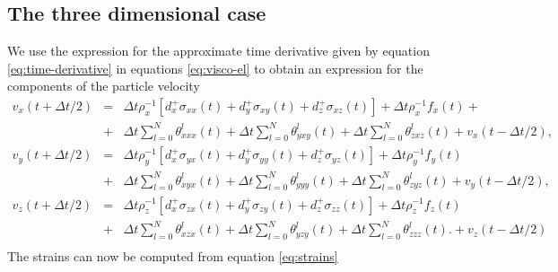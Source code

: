 \documentclass[11pt]{article}
\begin{document}
\subsection{The three dimensional case}

We use the expression for the approximate time derivative given by 
equation \eqref{eq:time-derivative}
in equations \eqref{eq:visco-el} to obtain an expression for the components of the particle velocity
\begin{eqnarray}
v_x(t+\Delta t/2) & = & \Delta t\rho_x^{-1}\left[d^+_x \sigma_{xx}(t) 
                         +d^+_y \sigma_{xy}(t) 
                         +d^+_z \sigma_{xz}(t)\right] 
                         + \Delta t \rho_x^{-1}f_x(t) +            \nonumber\\ 
                  & + & \Delta t \sum_{l=0}^N
                        \theta^l_{xxx}(t) +  
                        \Delta t \sum_{l=0}^N\theta^l_{yxy}(t) 
                     +  \Delta t \sum_{l=0}^N\theta^l_{zxz}(t)
                     +v_x(t-\Delta t/2),                           \nonumber\\
%
v_y(t+\Delta t/2) & = & \Delta t\rho_y^{-1}\left[d^+_x \sigma_{yx}(t) 
                        +d^+_y \sigma_{yy}(t) +d^+_z \sigma_{yz}(t)\right] 
                         + \Delta t \rho_y^{-1}f_y(t)              \nonumber\\
                  & + & \Delta t\sum_{l=0}^N\theta^l_{xyx}(t)    
                        +\Delta t\sum_{l=0}^N\theta^l_{yyy}(t) 
                        +\Delta t\sum_{l=0}^N\theta^l_{zyz}(t)
                        + v_y(t-\Delta t/2),                       \nonumber\\ 
%
v_z(t+\Delta t/2) & = & \Delta t \rho_z^{-1}\left[d^+_x \sigma_{zx}(t) 
                    +d^+_y \sigma_{zy}(t) +d^+_z \sigma_{zz}(t)\right] 
                    + \Delta t \rho_z^{-1}f_z(t)\nonumber\\  
                  & + & \Delta t\sum_{l=0}^N\theta^l_{xzx}(t) 
                    +  \Delta t\sum_{l=0}^N\theta^l_{yzy}(t) 
                    +  \Delta t\sum_{l=0}^N\theta^l_{zzz}(t)\nonumber.
                   +v_z(t-\Delta t/2) \\  
\end{eqnarray}
The strains can now be computed from equation \eqref{eq:strains}
\end{document}
